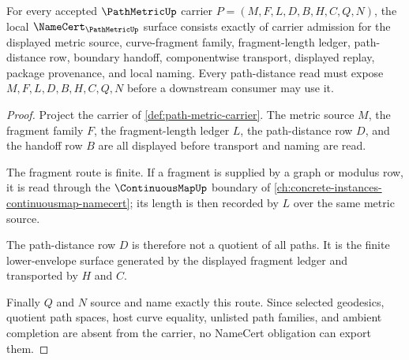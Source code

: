 \begin{theorem}
\label{thm:path-metric-namecert-obligations}
For every accepted $\PathMetricUp$ carrier $P=(M,F,L,D,B,H,C,Q,N)$, the local $\NameCert_{\PathMetricUp}$ surface consists exactly of carrier admission for the displayed metric source, curve-fragment family, fragment-length ledger, path-distance row, boundary handoff, componentwise transport, displayed replay, package provenance, and local naming. Every path-distance read must expose $M,F,L,D,B,H,C,Q,N$ before a downstream consumer may use it.
\end{theorem}
\begin{proof}
Project the carrier of \autoref{def:path-metric-carrier}. The metric source $M$, the fragment family $F$, the fragment-length ledger $L$, the path-distance row $D$, and the handoff row $B$ are all displayed before transport and naming are read.

The fragment route is finite. If a fragment is supplied by a graph or modulus row, it is read through the $\ContinuousMapUp$ boundary of \autoref{ch:concrete-instances-continuousmap-namecert}; its length is then recorded by $L$ over the same metric source.

The path-distance row $D$ is therefore not a quotient of all paths. It is the finite lower-envelope surface generated by the displayed fragment ledger and transported by $H$ and $C$.

Finally $Q$ and $N$ source and name exactly this route. Since selected geodesics, quotient path spaces, host curve equality, unlisted path families, and ambient completion are absent from the carrier, no NameCert obligation can export them.
\end{proof}

